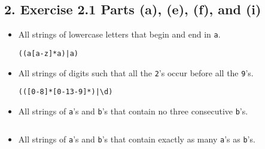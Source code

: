 \documentclass[12pt]{article}
\begin{document}
\subsection*{2. Exercise 2.1 Parts (a), (e), (f), and (i)}
\begin{itemize}
\item[a.] All strings of lowercase letters that begin and end in {\tt a}.
\begin{verbatim}((a[a-z]*a)|a)\end{verbatim}
\item[e.] All strings of digits such that all the {\tt 2}'s occur before all the {\tt 9}'s.
\begin{verbatim}(([0-8]*[0-13-9]*)|\d)\end{verbatim}
\item[f.] All strings of {\tt a}'s and {\tt b}'s that contain no three consecutive {\tt b}'s.
\begin{verbatim}\end{verbatim}
\item[i.] All strings of {\tt a}'s and {\tt b}'s that contain exactly as many {\tt a}'s as {\tt b}'s.
\begin{verbatim}\end{verbatim}
\end{itemize}
\end{document}
